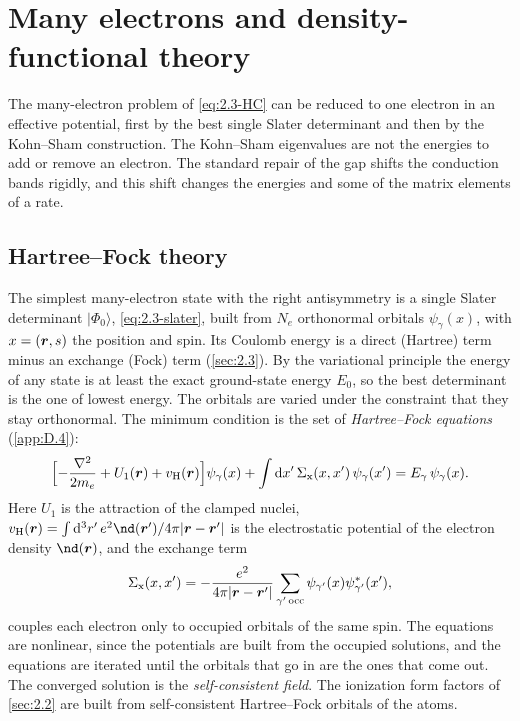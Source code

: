 \section{Many electrons and density-functional theory}\label{sec:3.4}

The many-electron problem of \cref{eq:2.3-HC} can be reduced to one electron in an effective potential, first by the best single Slater determinant and then by the Kohn--Sham construction. The Kohn--Sham eigenvalues are not the energies to add or remove an electron. The standard repair of the gap shifts the conduction bands rigidly, and this shift changes the energies and some of the matrix elements of a rate.

\subsection{Hartree--Fock theory}

The simplest many-electron state with the right antisymmetry is a single Slater determinant $|\Phi_0\rangle$, \cref{eq:2.3-slater}, built from $N_e$ orthonormal orbitals $\psi_\gamma(x)$, with $x = (\bm{r}, s)$ the position and spin. Its Coulomb energy is a direct (Hartree) term minus an exchange (Fock) term (\cref{sec:2.3}). By the variational principle the energy of any state is at least the exact ground-state energy $E_0$, so the best determinant is the one of lowest energy. The orbitals are varied under the constraint that they stay orthonormal. The minimum condition is the set of \emph{Hartree--Fock equations} (\cref{app:D.4}):
\begin{equation}
  \Bigl[-\frac{\nabla^2}{2m_e} + U_1(\bm{r}) + v_{\mathrm{H}}(\bm{r})\Bigr]\psi_\gamma(x) + \int\mathrm{d} x'\,\Sigma_{\mathrm{x}}(x, x')\,\psi_\gamma(x') = E_\gamma\,\psi_\gamma(x) .
  \label{eq:3.4-HF}
\end{equation}
Here $U_1$ is the attraction of the clamped nuclei, $v_{\mathrm{H}}(\vect{r}) = \int\dd^3r'\,e^2\nd(\vect{r}')/4\pi|\vect{r} - \vect{r}'|$ is the electrostatic potential of the electron density $\nd(\vect{r})$, and the exchange term
\begin{equation*}
  \Sigma_{\mathrm{x}}(x, x') = -\frac{e^2}{4\pi|\bm{r} - \bm{r}'|}\sum_{\gamma'\,\mathrm{occ}}\psi_{\gamma'}(x)\psi^*_{\gamma'}(x') ,
\end{equation*}
couples each electron only to occupied orbitals of the same spin. The equations are nonlinear, since the potentials are built from the occupied solutions, and the equations are iterated until the orbitals that go in are the ones that come out. The converged solution is the \emph{self-consistent field}. The ionization form factors of \cref{sec:2.2} are built from self-consistent Hartree--Fock orbitals of the atoms.

